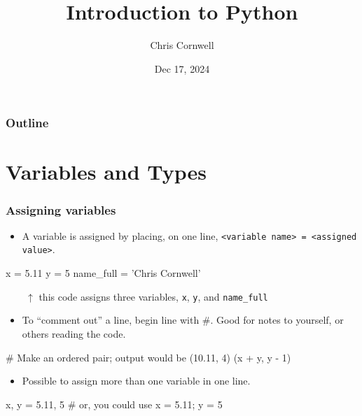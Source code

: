 \documentclass{beamer}
\author{Chris Cornwell}
\date{Dec 17, 2024}
\title{Introduction to Python}
\newenvironment{codeblock}
    {\hfill\begin{beamerboxesrounded}[lower=codecol, width=0.8\textwidth]
    \medskip

    }
    { 
    \end{beamerboxesrounded}\hfill
    }
\theoremstyle{example}
\newcommand{\ct}[1]{\lstinline[language=Python]!#1!}
\newcommand{\ttt}[1]{{\small\texttt{#1}}}
\begin{document}
\begin{frame}
\titlepage
\end{frame}

\begin{frame}
\frametitle{Outline}
\tableofcontents
\end{frame}

\section{Variables and Types}

\begin{frame}[fragile]
\frametitle{Assigning variables}

\begin{itemize}
	\item A variable is assigned by placing, on one line, \mbox{\ttt{<variable name> = <assigned value>}.}
\end{itemize}
\begin{codeblock}

\begin{python}
x = 5.11
y = 5
name_full = 'Chris Cornwell'
\end{python}

\end{codeblock}

$\qquad\uparrow$ this code assigns three variables, \ttt{x}, \ttt{y}, and \ttt{name}\ct{_}\ttt{full}

\pause
\begin{itemize}
	\item To ``comment out'' a line, begin line with \#. Good for notes to yourself, or others reading the code.
\end{itemize}

\begin{codeblock}

\begin{python}
# Make an ordered pair; output would be (10.11, 4)
(x + y, y - 1)
\end{python}

\end{codeblock}

\pause
\begin{itemize}
	\item Possible to assign more than one variable in one line.
\end{itemize}

\begin{codeblock}

\begin{python}
x, y = 5.11, 5
# or, you could use 
x = 5.11; y = 5
\end{python}

\end{codeblock}
\end{frame}
\end{document}
